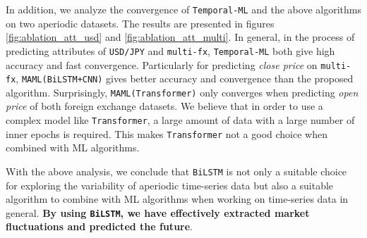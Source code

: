 
In addition, we analyze the convergence of \verb|Temporal-ML| and the above algorithms on two aperiodic datasets. The results are presented in figures \ref{fig:ablation_att_usd} and \ref{fig:ablation_att_multi}. In general, in the process of predicting attributes of \verb|USD/JPY| and \verb|multi-fx|, \verb|Temporal-ML| both give high accuracy and fast convergence. Particularly for predicting \textit{close price} on \verb|multi-fx|, \verb|MAML(BiLSTM+CNN)| gives better accuracy and convergence than the proposed algorithm. Surprisingly, \verb|MAML(Transformer)| only converges when predicting \textit{open price} of both foreign exchange datasets. We believe that in order to use a complex model like \verb|Transformer|, a large amount of data with a large number of inner epochs is required. This makes \verb|Transformer| not a good choice when combined with ML algorithms.


With the above analysis, we conclude that \verb|BiLSTM| is not only a suitable choice for exploring the variability of aperiodic time-series data but also a suitable algorithm to combine with ML algorithms when working on time-series data in general. \textbf{By using \Verb|BiLSTM|, we have effectively extracted market fluctuations and predicted the future}.

